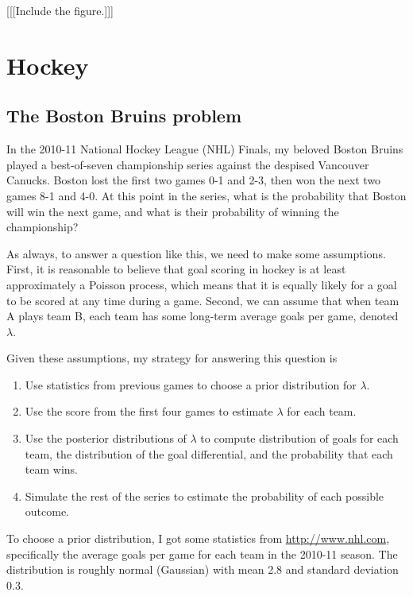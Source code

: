 \documentclass[12pt]{book}
\begin{document}
[[[Include the figure.]]]


\chapter{Hockey}

\section{The Boston Bruins problem}

In the 2010-11 National Hockey League (NHL) Finals, my beloved Boston
Bruins played a best-of-seven championship series against the despised
Vancouver Canucks.  Boston lost the first two games 0-1 and 2-3, then
won the next two games 8-1 and 4-0.  At this point in the series, what
is the probability that Boston will win the next game, and what is
their probability of winning the championship?

As always, to answer a question like this, we need to make some
assumptions.  First, it is reasonable to believe that goal scoring in
hockey is at least approximately a Poisson process, which means that
it is equally likely for a goal to be scored at any time during a
game.  Second, we can assume that when team A plays team B, each team
has some long-term average goals per game, denoted $\lambda$.

Given these assumptions, my strategy for answering this question is

\begin{enumerate}

\item Use statistics from previous games to choose a prior
distribution for $\lambda$.

\item Use the score from the first four games to estimate $\lambda$
for each team.

\item Use the posterior distributions of $\lambda$ to compute 
distribution of goals for each team, the distribution of the
goal differential, and the probability that each team wins.

\item Simulate the rest of the series to estimate the probability
of each possible outcome.

\end{enumerate}

To choose a prior distribution, I got some statistics from
\url{http://www.nhl.com}, specifically the average goals per game
for each team in the 2010-11 season.  The distribution is roughly
normal (Gaussian) with mean 2.8 and standard deviation 0.3.
\end{document}
